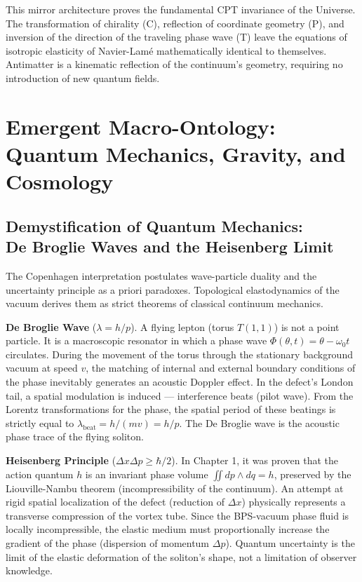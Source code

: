 \documentclass[11pt,a4paper]{article}
\begin{document}
	This mirror architecture proves the fundamental CPT invariance of the Universe. The transformation of chirality (C), reflection of coordinate geometry (P), and inversion of the direction of the traveling phase wave (T) leave the equations of isotropic elasticity of Navier-Lamé mathematically identical to themselves. Antimatter is a kinematic reflection of the continuum's geometry, requiring no introduction of new quantum fields.
	
\section{Emergent Macro-Ontology:\\ Quantum Mechanics, Gravity, and Cosmology}
	
\subsection{Demystification of Quantum Mechanics: \\ De Broglie Waves and the Heisenberg Limit}
	The Copenhagen interpretation postulates wave-particle duality and the uncertainty principle as a priori paradoxes. Topological elastodynamics of the vacuum derives them as strict theorems of classical continuum mechanics.

\textbf{De Broglie Wave} ($\lambda = h/p$). A flying lepton (torus $T(1,1)$) is not a point particle. It is a macroscopic resonator in which a phase wave $\Phi(\theta, t) = \theta - \omega_0 t$ circulates. During the movement of the torus through the stationary background vacuum at speed $v$, the matching of internal and external boundary conditions of the phase inevitably generates an acoustic Doppler effect. In the defect's London tail, a spatial modulation is induced — interference beats (pilot wave). From the Lorentz transformations for the phase, the spatial period of these beatings is strictly equal to $\lambda_{\text{beat}} = h / (mv) = h/p$. The De Broglie wave is the acoustic phase trace of the flying soliton.

\textbf{Heisenberg Principle} ($\Delta x \Delta p \ge \hbar/2$). In Chapter 1, it was proven that the action quantum $h$ is an invariant phase volume $\iint dp \wedge dq = h$, preserved by the Liouville-Nambu theorem (incompressibility of the continuum). An attempt at rigid spatial localization of the defect (reduction of $\Delta x$) physically represents a transverse compression of the vortex tube. Since the BPS-vacuum phase fluid is locally incompressible, the elastic medium must proportionally increase the gradient of the phase (dispersion of momentum $\Delta p$). Quantum uncertainty is the limit of the elastic deformation of the soliton's shape, not a limitation of observer knowledge.
\end{document}
